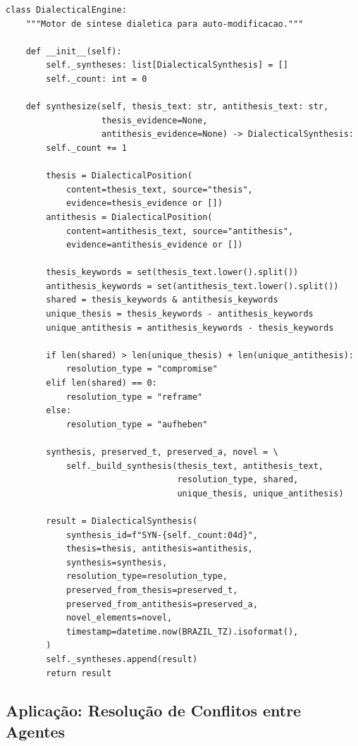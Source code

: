\begin{lstlisting}[style=pythonstyle, caption={DialecticalEngine: sintese dialetica (dialectical\_engine.py:62-143)}]
class DialecticalEngine:
    """Motor de sintese dialetica para auto-modificacao."""

    def __init__(self):
        self._syntheses: list[DialecticalSynthesis] = []
        self._count: int = 0

    def synthesize(self, thesis_text: str, antithesis_text: str,
                   thesis_evidence=None,
                   antithesis_evidence=None) -> DialecticalSynthesis:
        self._count += 1

        thesis = DialecticalPosition(
            content=thesis_text, source="thesis",
            evidence=thesis_evidence or [])
        antithesis = DialecticalPosition(
            content=antithesis_text, source="antithesis",
            evidence=antithesis_evidence or [])

        thesis_keywords = set(thesis_text.lower().split())
        antithesis_keywords = set(antithesis_text.lower().split())
        shared = thesis_keywords & antithesis_keywords
        unique_thesis = thesis_keywords - antithesis_keywords
        unique_antithesis = antithesis_keywords - thesis_keywords

        if len(shared) > len(unique_thesis) + len(unique_antithesis):
            resolution_type = "compromise"
        elif len(shared) == 0:
            resolution_type = "reframe"
        else:
            resolution_type = "aufheben"

        synthesis, preserved_t, preserved_a, novel = \
            self._build_synthesis(thesis_text, antithesis_text,
                                  resolution_type, shared,
                                  unique_thesis, unique_antithesis)

        result = DialecticalSynthesis(
            synthesis_id=f"SYN-{self._count:04d}",
            thesis=thesis, antithesis=antithesis,
            synthesis=synthesis,
            resolution_type=resolution_type,
            preserved_from_thesis=preserved_t,
            preserved_from_antithesis=preserved_a,
            novel_elements=novel,
            timestamp=datetime.now(BRAZIL_TZ).isoformat(),
        )
        self._syntheses.append(result)
        return result
\end{lstlisting}

\subsection{Aplicação: Resolução de Conflitos entre Agentes}

